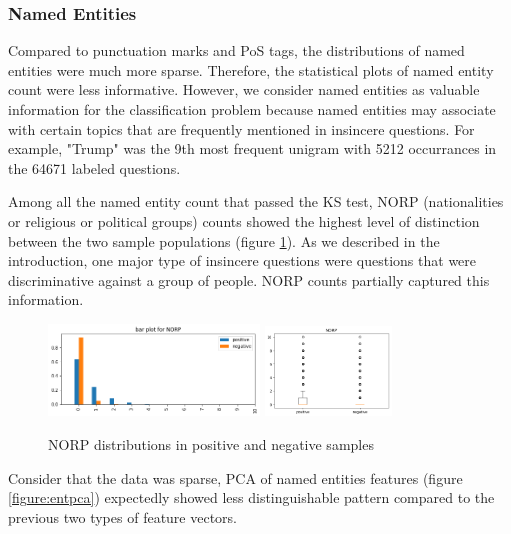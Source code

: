 \documentclass[12pt]{diazessay} %
\begin{document}

\subsubsection{Named Entities} %
\label{ssub:named_entities}

Compared to punctuation marks and PoS tags, the distributions of named entities were much more sparse. Therefore, the statistical plots of named entity count were less informative. However, we consider named entities as valuable information for the classification problem because named entities may associate with certain topics that are frequently mentioned in insincere questions. For example, "Trump" was the 9th most frequent unigram with 5212 occurrances in the 64671 labeled questions. 

Among all the named entity count that passed the KS test, NORP (nationalities or religious or political groups) counts showed the highest level of distinction between the two sample populations (figure \ref{figure:norp}). As we described in the introduction, one major type of insincere questions were questions that were discriminative against a group of people. NORP counts partially captured this information. 

\begin{figure}[!htbp]
    \centering
    \includegraphics[width=0.5\textwidth]{graphs/bar_norp.png}
    \includegraphics[width=0.3\textwidth]{graphs/norp_box.png}
    \caption{NORP distributions in positive and negative samples}
    \label{figure:norp}
\end{figure}

Consider that the data was sparse, PCA of named entities features (figure \ref{figure:entpca}) expectedly showed less distinguishable pattern compared to the previous two types of feature vectors. 
\end{document}
